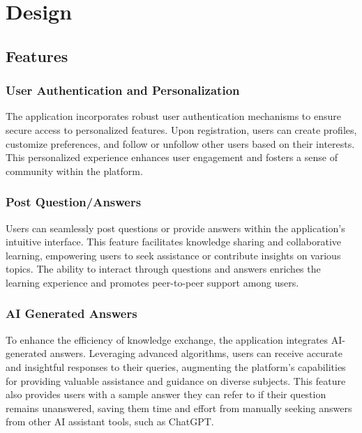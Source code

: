
\chapter{Design}\label{ch:design}

\section{Features}

\subsection{User Authentication and Personalization}

The application incorporates robust user authentication mechanisms to ensure secure access to personalized features. Upon registration, users can create profiles, customize preferences, and follow or unfollow other users based on their interests. This personalized experience enhances user engagement and fosters a sense of community within the platform.

\subsection{Post Question/Answers}

Users can seamlessly post questions or provide answers within the application's intuitive interface. This feature facilitates knowledge sharing and collaborative learning, empowering users to seek assistance or contribute insights on various topics. The ability to interact through questions and answers enriches the learning experience and promotes peer-to-peer support among users.

\subsection{AI Generated Answers}

To enhance the efficiency of knowledge exchange, the application integrates AI-generated answers. Leveraging advanced algorithms, users can receive accurate and insightful responses to their queries, augmenting the platform's capabilities for providing valuable assistance and guidance on diverse subjects. This feature also provides users with a sample answer they can refer to if their question remains unanswered, saving them time and effort from manually seeking answers from other AI assistant tools, such as ChatGPT.


